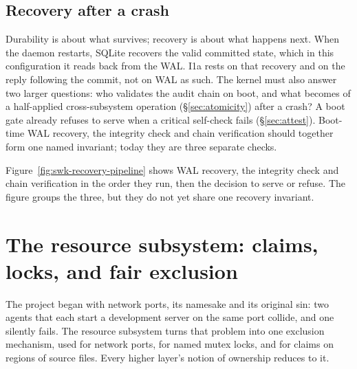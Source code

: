 \documentclass[11pt,a4paper]{article}
\theoremstyle{definition}
\theoremstyle{remark}
\begin{document}
\subsection{Recovery after a crash}
Durability is about what survives; recovery is about what happens next. When the
daemon restarts, SQLite recovers the valid committed state, which in this
configuration it reads back from the WAL. I1a rests on that recovery and on the
reply following the commit, not on WAL as such. The kernel must also answer two larger questions: who validates the
audit chain on boot, and what becomes of a half-applied cross-subsystem
operation (\S\ref{sec:atomicity}) after a crash? A boot gate already refuses to
serve when a critical self-check fails (\S\ref{sec:attest}). Boot-time WAL
recovery, the integrity check and chain verification should together form one
named invariant; today they are three separate checks.

Figure~\ref{fig:swk-recovery-pipeline} shows WAL recovery, the integrity check
and chain verification in the order they run, then the decision to serve or
refuse. The figure groups the three, but they do not yet share one recovery
invariant.
\pdexercisepointer{\ref{ex:swk-fault-classes}}{\ref{ex:swk-op10-interface}}{\pageref{ex:swk-fault-classes}}
\section{The resource subsystem: claims, locks, and fair exclusion}
\label{sec:resource}
The project began with network ports, its namesake and its original sin: two agents that each start a development
server on the same port collide, and one silently fails. The resource subsystem
turns that problem into one exclusion mechanism, used for network ports, for
named mutex locks, and for claims on regions of source files. Every higher
layer's notion of ownership reduces to it.
\end{document}
